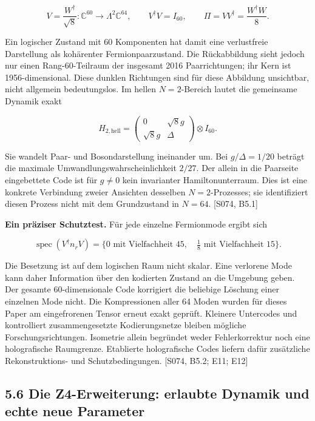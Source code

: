 \[V=\frac{W^\dagger}{\sqrt8}:\mathbb C^{60}\longrightarrow\Lambda^2\mathbb C^{64},
\qquad V^\dagger V=I_{60},\qquad
\Pi=VV^\dagger=\frac{W^\dagger W}{8}.\]

Ein logischer Zustand mit 60 Komponenten hat damit eine verlustfreie
Darstellung als kohärenter Fermionpaarzustand. Die Rückabbildung sieht
jedoch nur einen Rang-60-Teilraum der insgesamt 2016 Paarrichtungen; ihr
Kern ist 1956-dimensional. Diese dunklen Richtungen sind für diese
Abbildung unsichtbar, nicht allgemein bedeutungslos. Im hellen
\(N=2\)-Bereich lautet die gemeinsame Dynamik exakt

\[H_{2,\mathrm{hell}}=
\begin{pmatrix}0&\sqrt8g\\\sqrt8g&\Delta\end{pmatrix}\otimes I_{60}.\]

Sie wandelt Paar- und Bosondarstellung ineinander um. Bei
\(g/\Delta=1/20\) beträgt die maximale Umwandlungswahrscheinlichkeit
\(2/27\). Der allein in die Paarseite eingebettete Code ist für
\(g\ne0\) kein invarianter Hamiltonunterraum. Dies ist eine konkrete
Verbindung zweier Ansichten desselben \(N=2\)-Prozesses; sie
identifiziert diesen Prozess nicht mit dem Grundzustand in \(N=64\).
{[}S074, B5.1{]}

\textbf{Ein präziser Schutztest.} Für jede einzelne Fermionmode ergibt
sich

\[\operatorname{spec}(V^\dagger n_rV)
=\{0\text{ mit Vielfachheit }45,\quad
\tfrac18\text{ mit Vielfachheit }15\}.\]

Die Besetzung ist auf dem logischen Raum nicht skalar. Eine verlorene
Mode kann daher Information über den kodierten Zustand an die Umgebung
geben. Der gesamte 60-dimensionale Code korrigiert die beliebige
Löschung einer einzelnen Mode nicht. Die Kompressionen aller 64 Moden
wurden für dieses Paper am eingefrorenen Tensor erneut exakt geprüft.
Kleinere Untercodes und kontrolliert zusammengesetzte Kodierungsnetze
bleiben mögliche Forschungsrichtungen. Isometrie allein begründet weder
Fehlerkorrektur noch eine holografische Raumgrenze. Etablierte
holografische Codes liefern dafür zusätzliche Rekonstruktions- und
Schutzbedingungen. {[}S074, B5.2; E11; E12{]}

\subsection{5.6 Die Z4-Erweiterung: erlaubte Dynamik und echte neue
Parameter}\label{die-z4-erweiterung-erlaubte-dynamik-und-echte-neue-parameter}

